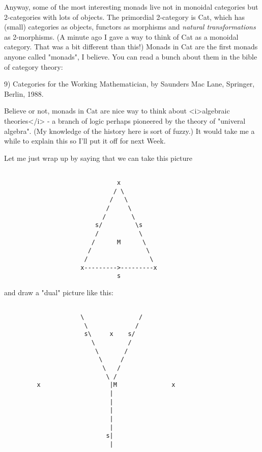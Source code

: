 Anyway, some of the most interesting monads live not in monoidal
categories but 2-categories with lots of objects.  The primordial
2-category is Cat, which has (small) categories as objects, functors as
morphisms and \emph{natural transformations} as 2-morphisms.  (A minute ago I
gave a way to think of Cat as a monoidal category.  That was a bit
different than this!)  Monads in Cat are the first monads anyone called
"monads", I believe.  You can read a bunch about them in the bible of
category theory:

9) Categories for the Working Mathematician, by Saunders Mac Lane,
Springer, Berlin, 1988.

Believe or not, monads in Cat are nice way to think about <i>algebraic
theories</i> - a branch of logic perhaps pioneered by the theory of
"univeral algebra". (My knowledge of the history here is sort of fuzzy.) 
It would take me a while to explain this so I'll put it off for next
Week.  

Let me just wrap up by saying that we can take this picture 


\begin{verbatim}

                               x
                              / \
                             /   \
                            /     \
                           /       \
                         s/         \s
                         /           \
                        /      M      \
                       /               \
                      /                 \
                     x--------->---------x
                               s

\end{verbatim}
    
and draw a "dual" picture like this:


\begin{verbatim}

                     \               /
                      \             /
                      s\     x    s/
                        \         /
                         \       /
                          \     /
                           \   /
                            \ /
         x                   |M               x
                             |
                             |
                             |
                             |
                             |
                            s|
                             |

\end{verbatim}
    
